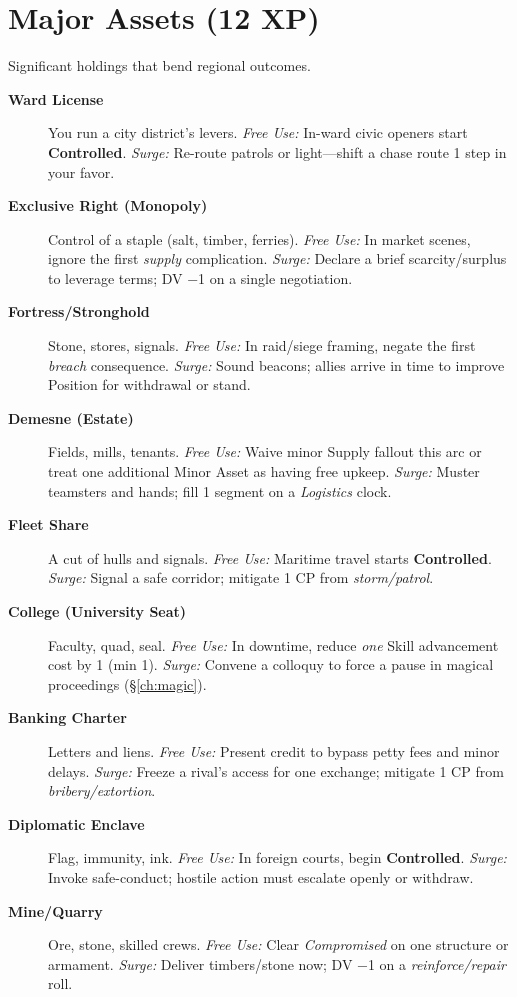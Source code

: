 \section{Major Assets (12 XP)}
Significant holdings that bend regional outcomes.
\begin{description}
  \item[\textbf{Ward License}]  You run a city district’s levers. \emph{Free Use:} In-ward civic openers start \textbf{Controlled}. \emph{Surge:} Re-route patrols or light—shift a chase route 1 step in your favor.
  \item[\textbf{Exclusive Right (Monopoly)}]  Control of a staple (salt, timber, ferries). \emph{Free Use:} In market scenes, ignore the first \emph{supply} complication. \emph{Surge:} Declare a brief scarcity/surplus to leverage terms; DV −1 on a single negotiation.
  \item[\textbf{Fortress/Stronghold}]  Stone, stores, signals. \emph{Free Use:} In raid/siege framing, negate the first \emph{breach} consequence. \emph{Surge:} Sound beacons; allies arrive in time to improve Position for withdrawal or stand.
  \item[\textbf{Demesne (Estate)}]  Fields, mills, tenants. \emph{Free Use:} Waive minor Supply fallout this arc or treat one additional Minor Asset as having free upkeep. \emph{Surge:} Muster teamsters and hands; fill 1 segment on a \emph{Logistics} clock.
  \item[\textbf{Fleet Share}]  A cut of hulls and signals. \emph{Free Use:} Maritime travel starts \textbf{Controlled}. \emph{Surge:} Signal a safe corridor; mitigate 1 CP from \emph{storm/patrol}.
  \item[\textbf{College (University Seat)}]  Faculty, quad, seal. \emph{Free Use:} In downtime, reduce \emph{one} Skill advancement cost by 1 (min 1). \emph{Surge:} Convene a colloquy to force a pause in magical proceedings (\S\ref{ch:magic}).
  \item[\textbf{Banking Charter}]  Letters and liens. \emph{Free Use:} Present credit to bypass petty fees and minor delays. \emph{Surge:} Freeze a rival’s access for one exchange; mitigate 1 CP from \emph{bribery/extortion}.
  \item[\textbf{Diplomatic Enclave}]  Flag, immunity, ink. \emph{Free Use:} In foreign courts, begin \textbf{Controlled}. \emph{Surge:} Invoke safe-conduct; hostile action must escalate openly or withdraw.
  \item[\textbf{Mine/Quarry}]  Ore, stone, skilled crews. \emph{Free Use:} Clear \emph{Compromised} on one structure or armament. \emph{Surge:} Deliver timbers/stone now; DV −1 on a \emph{reinforce/repair} roll.
\end{description}

